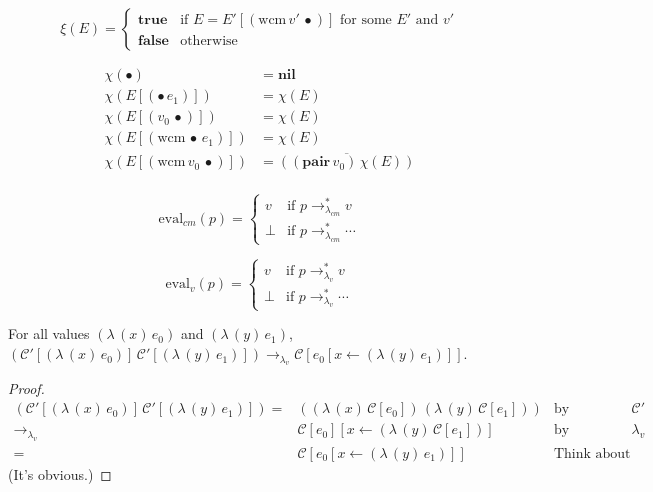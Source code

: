 \documentclass[ms,electronic,twosidetoc,letterpaper,chaptercenter,parttop]{byumsphd}
\newcommand{\nil}{\mathbf{nil}}
\newcommand{\pair}[2]{((\mathbf{pair}\,#1)\,#2)}
\newcommand{\eval}[1]{\overline{#1}}
\newcommand{\lvrr}{\rightarrow_{\lambda_v}}
\newcommand{\lvrrs}{\rightarrow_{\lambda_v}^{*}}
\newcommand{\cmrrs}{\rightarrow_{\lambda_{cm}}^{*}}
\newcommand{\C}[1]{\mathcal{C}[#1]}
\newcommand{\Cp}[1]{\mathcal{C}'[#1]}
\newcommand{\abs}[2]{(\lambda\,(#1)\,#2)}
\newcommand{\app}[2]{(#1\,#2)}
\newcommand{\wcm}[2]{(\mathrm{wcm}\,#1\,#2)}
\newcommand{\hole}{\bullet}
\begin{document}
\begin{defn}
\[
\xi(E)=\begin{cases}
\mathbf{true} &\text{if $E=E'[\wcm{v'}{\hole}]$ for some $E'$ and $v'$}\\
\mathbf{false} &\text{otherwise}
\end{cases}
\]
\end{defn}

\begin{defn}
\begin{align*}
\chi(\hole)               &= \nil\\
\chi(E[\app{\hole}{e_1}]) &= \chi(E)\\
\chi(E[\app{v_0}{\hole}]) &= \chi(E)\\
\chi(E[\wcm{\hole}{e_1}]) &= \chi(E)\\
\chi(E[\wcm{v_0}{\hole}]) &= \eval{\pair{v_0}{\chi(E)}}\\
\end{align*}
\end{defn}

\begin{defn}
\[
\mathrm{eval}_{cm}(p)=\begin{cases}
v     &\text{if $p\cmrrs v$}\\
\perp &\text{if $p\cmrrs\cdots$}
\end{cases}
\]
\end{defn}

\begin{defn}
\[
\mathrm{eval}_{v}(p)=\begin{cases}
v     &\text{if $p\lvrrs v$}\\
\perp &\text{if $p\lvrrs\cdots$}
\end{cases}
\]
\end{defn}

\begin{lemma}
\label{cm-app}
For all values $\abs{x}{e_0}$ and $\abs{y}{e_1}$, $\app{\Cp{\abs{x}{e_0}}}{\Cp{\abs{y}{e_1}}}\lvrr\C{e_0[x\leftarrow \abs{y}{e_1}]}$.
\end{lemma}

\begin{proof}
\begin{align*}
\app{\Cp{\abs{x}{e_0}}}{\Cp{\abs{y}{e_1}}} = &\app{\abs{x}{\C{e_0}}}{\abs{y}{\C{e_1}}}&\text{by definition of $\mathcal{C}'$}\\
                                       \lvrr &\C{e_0}[x\leftarrow \abs{y}{\C{e_1}}]&\text{by semantics of $\lambda_v$}\\
                                           = &\C{e_0[x\leftarrow \abs{y}{e_1}}]&\text{Think about it.}
\end{align*}
(It's obvious.)
\end{proof}
\end{document}
